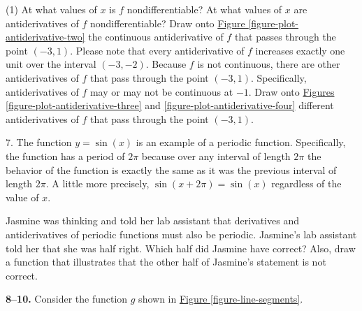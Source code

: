\documentclass[10pt,oneside,]{book}
\theoremstyle{plain}
\theoremstyle{definition}
\numberwithin{equation}{section}
\newcommand{\fe}[2]{#1\mathopen{}\left(#2\right)\mathclose{}}
\newcommand{\ointerval}[2]{\left(#1,#2\right)}
\newcommand{\point}[2]{\left(#1,#2\right)}
\begin{document}
\begin{exercisegroup}(1)
\exercise[3.]\hypertarget{exercise-262}{\null}At what values of \(x\) is \(f\) nondifferentiable?%
\exercise[4.]\hypertarget{exercise-263}{\null}At what values of \(x\) are antiderivatives of \(f\) nondifferentiable?%
\exercise[5.]\hypertarget{exercise-264}{\null}Draw onto \hyperref[figure-plot-antiderivative-two]{Figure \ref{figure-plot-antiderivative-two}} the continuous antiderivative of \(f\) that passes through the point \(\point{-3}{1}\).  Please note that every antiderivative of \(f\) increases exactly one unit over the interval \(\ointerval{-3}{-2}\).%
\exercise[6.]\hypertarget{exercise-265}{\null}Because \(f\) is not continuous, there are other antiderivatives of \(f\) that pass through the point \(\point{-3}{1}\). Specifically, antiderivatives of \(f\) may or may not be continuous at \(-1\).  Draw onto \hyperref[figure-plot-antiderivative-three]{Figures \ref{figure-plot-antiderivative-three}} and \hyperref[figure-plot-antiderivative-four]{\ref{figure-plot-antiderivative-four}} different antiderivatives of \(f\) that pass through the point \(\point{-3}{1}\).%
\end{exercisegroup}
\par\smallskip\noindent
\begin{exerciselist}
\item[7.]\hypertarget{exercise-266}{\null}The function \(y=\fe{\sin}{x}\) is an example of a periodic function.  Specifically, the function has a period of \(2\pi\) because over any interval of length \(2\pi\) the behavior of the function is exactly the same as it was the previous interval of length \(2\pi\).  A little more precisely, \(\fe{\sin}{x+2\pi}=\fe{\sin}{x}\) regardless of the value of \(x\).%
\par
Jasmine was thinking and told her lab assistant that derivatives and antiderivatives of periodic functions must also be periodic.  Jasmine's lab assistant told her that she was half right.  Which half did Jasmine have correct?  Also, draw a function that illustrates that the other half of Jasmine's statement is not correct.%
\par\smallskip
\end{exerciselist}
\textbf{8--10. }\hypertarget{exercisegroup-55}{\null}Consider the function \(g\) shown in \hyperref[figure-line-segments]{Figure \ref{figure-line-segments}}.%
\end{document}
